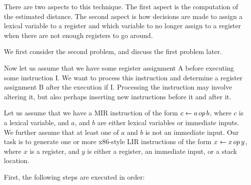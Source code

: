 There are two aspects to this technique.  The first aspect is the
computation of the estimated distance.  The second aspect is how
decisions are made to assign a lexical variable to a register and
which variable to no longer assign to a register when there are not
enough registers to go around.

We first consider the second problem, and discuss the first problem later.

Now let us assume that we have some register assignment A before
executing some instruction I.  We want to process this instruction and
determine a register assignment B after the execution if I.
Processing the instruction may involve altering it, but also perhaps
inserting new instructions before it and after it.

Let us assume that we have a MIR instruction of the form $c \leftarrow
a\thinspace op\thinspace b$, where $c$ is a lexical variable, and $a$,
and $b$ are either lexical variables or immediate inputs.  We further
assume that at least one of $a$ and $b$ is not an immediate input.
Our task is to generate one or more x86-style LIR instructions of the
form $x \leftarrow x\thinspace op\thinspace y$, where $x$ is a
register, and $y$ is either a register, an immediate input, or a stack
location.



First, the following steps are executed in order:

